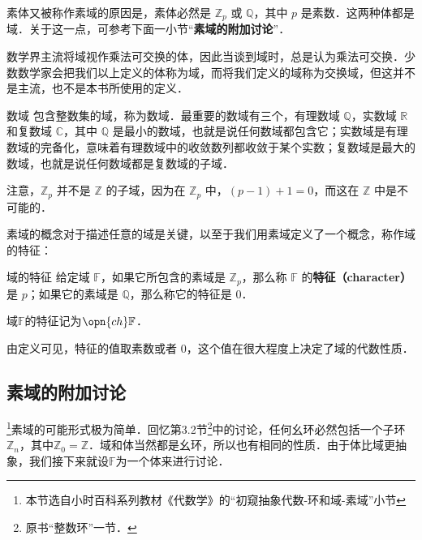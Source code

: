 素体又被称作素域的原因是，素体必然是 $\mathbb{Z}_p$ 或 $\mathbb{Q}$，其中 $p$ 是素数．这两种体都是域．关于这一点，可参考下面一小节“\textbf{素域的附加讨论}”．




数学界主流将域视作乘法可交换的体，因此当谈到域时，总是认为乘法可交换．少数数学家会把我们以上定义的体称为域，而将我们定义的域称为交换域，但这并不是主流，也不是本书所使用的定义．

\begin{example}{数域}
包含整数集的域，称为数域．最重要的数域有三个，有理数域 $\mathbb{Q}$，实数域 $\mathbb{R}$ 和复数域 $\mathbb{C}$，其中 $\mathbb{Q}$ 是最小的数域，也就是说任何数域都包含它；实数域是有理数域的完备化，意味着有理数域中的收敛数列都收敛于某个实数；复数域是最大的数域，也就是说任何数域都是复数域的子域．

注意，$\mathbb{Z}_p$ 并不是 $\mathbb{Z}$ 的子域，因为在 $\mathbb{Z}_p$ 中，$(p-1)+1=0$，而这在 $\mathbb{Z}$ 中是不可能的．
\end{example}

素域的概念对于描述任意的域是关键，以至于我们用素域定义了一个概念，称作域的特征：

\begin{definition}{域的特征}\label{field_def2}
给定域 $\mathbb{F}$，如果它所包含的素域是 $\mathbb{Z}_p$，那么称 $\mathbb{F}$ 的\textbf{特征（character）}是 $p$；如果它的素域是 $\mathbb{Q}$，那么称它的特征是 $0$．

域$\mathbb{F}$的特征记为$\opn{ch}\mathbb{F}$．
\end{definition}

由定义可见，特征的值取素数或者 $0$，这个值在很大程度上决定了域的代数性质．


\subsection{素域的附加讨论}

\footnote{本节选自小时百科系列教材《代数学》的“初窥抽象代数-环和域-素域”小节}素域的可能形式极为简单．回忆第3.2节\footnote{原书“整数环”一节．}中的讨论，任何幺环必然包括一个子环$\mathbb{Z}_n$，其中$\mathbb{Z}_0=\mathbb{Z}$．域和体当然都是幺环，所以也有相同的性质．由于体比域更抽象，我们接下来就设$\mathbb{F}$为一个体来进行讨论．

